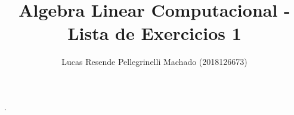 \documentclass[11pt]{article}
\begin{document}
  {}%
  {}%
  {}%
  {}%
  {\bfseries}%
  {.}%
  {\newline}%
  {}%

\theoremstyle{definition}
\theoremstyle{break}
\newtheorem{exerc}{Exercício}

\author{Lucas Resende Pellegrinelli Machado (2018126673)}
\title{Algebra Linear Computacional - Lista de Exercicios 1}
\maketitle

\medskip
\end{document}
